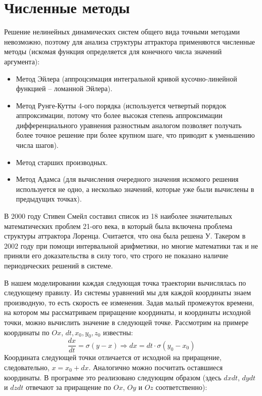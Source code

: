 \documentclass[12pt]{article}
\begin{document}
\section{Численные методы}

Решение нелинейных динамических систем общего вида точными методами невозможно, поэтому для анализа структуры аттрактора применяются численные методы (искомая функция определяется для конечного числа значений аргумента):
\begin{itemize}
\item Метод Эйлера (аппроцсимация интегральной кривой кусочно-линейной функцией -- ломанной Эйлера).
\item Метод Рунге-Кутты 4-ого порядка (используется четвертый порядок аппроксимации, потому что более высокая степень аппроксимации дифференциального уравнения разностным аналогом позволяет получать более точное решение при более крупном шаге, что приводит к уменьшению числа шагов).
\item Метод старших производных.
\item Метод Адамса (для вычисления очередного значения искомого решения используется не одно, а несколько значений, которые уже были вычислены в предыдущих точках).
\end{itemize} 

В 2000 году Стивен Смейл составил список из 18 наиболее значительных математических проблем 21-ого века, в который была включена проблема структуры аттрактора Лоренца. Считается, что она была решена У. Такером в 2002 году при помощи интервальной арифметики, но многие математики так и не приняли его доказательства в силу того, что строго не показано наличие периодических решений в системе.

В нашем моделировании каждая следующая точка траектории вычислялась по следующему правилу. Из системы уравнений мы для каждой координаты знаем производную, то есть скорость ее изменения. Задав малый промежуток времени, на котором мы рассматриваем приращение координаты, и координаты исходной точки, можно вычислить значение в следующей точке. Рассмотрим на примере координаты по $Ox$, $dt, x_0, y_0, z_0$ известны:
\begin{equation*}
\frac{dx}{dt} = \sigma (y-x) \Rightarrow dx = dt \cdot \sigma (y_0-x_0)
\end{equation*}
Координата следующей точки отличается от исходной на приращение, следовательно, $x = x_0 + dx$. Аналогично можно посчитать оставшиеся координаты. В программе это реализовано следующим образом (здесь $dxdt$, $dydt$ и $dzdt$ отвечают за приращение по $Ox$, $Oy$ и $Oz$ соответственно):
\end{document}
